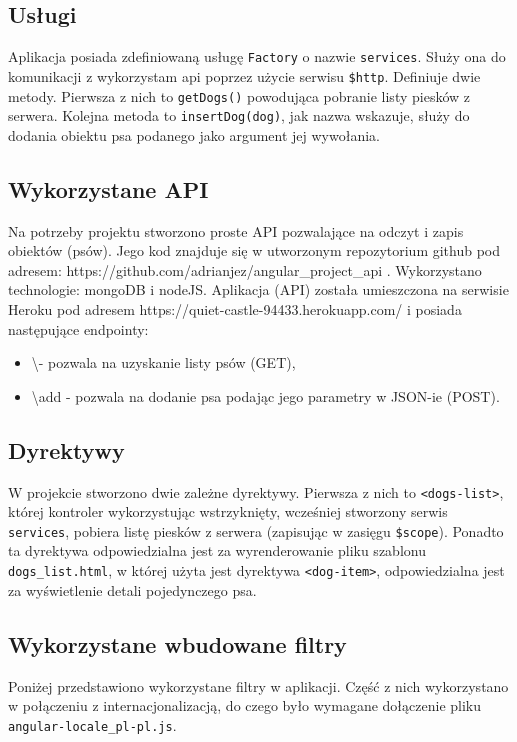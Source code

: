 \documentclass{article}
\begin{document}
\subsection{Usługi}
Aplikacja posiada zdefiniowaną usługę \verb|Factory| o nazwie \verb|services|. Służy ona do komunikacji z wykorzystam api poprzez użycie serwisu \verb|$http|. Definiuje dwie metody. Pierwsza z nich to \verb|getDogs()| powodująca pobranie listy piesków z serwera. Kolejna metoda to \verb|insertDog(dog)|, jak nazwa wskazuje, służy do dodania obiektu psa podanego jako argument jej wywołania. 

\subsection{Wykorzystane API}

Na potrzeby projektu stworzono proste API pozwalające na odczyt i zapis obiektów (psów). Jego kod znajduje się w utworzonym repozytorium github pod adresem: https://github.com/adrianjez/angular\_project\_api . Wykorzystano technologie: mongoDB i nodeJS. Aplikacja (API) została umieszczona na serwisie Heroku pod adresem https://quiet-castle-94433.herokuapp.com/ i posiada następujące endpointy:

\begin{itemize}
	\item \textbackslash  - pozwala na uzyskanie listy psów (GET),
	\item \textbackslash add  - pozwala na dodanie psa podając jego parametry w JSON-ie (POST).
\end{itemize}

\subsection{Dyrektywy}
W projekcie stworzono dwie zależne dyrektywy. Pierwsza z nich to \verb|<dogs-list>|, której kontroler wykorzystując wstrzyknięty, wcześniej stworzony serwis \verb|services|, pobiera listę piesków z serwera (zapisując w zasięgu \verb|$scope|). Ponadto ta dyrektywa odpowiedzialna jest za wyrenderowanie pliku szablonu \verb|dogs_list.html|, w której użyta jest dyrektywa \verb|<dog-item>|, odpowiedzialna jest za wyświetlenie detali pojedynczego psa. 

\subsection{Wykorzystane wbudowane filtry}
Poniżej przedstawiono wykorzystane  filtry w aplikacji. Część z nich wykorzystano w połączeniu z internacjonalizacją, do czego było wymagane dołączenie pliku \verb|angular-locale_pl-pl.js|. 
\end{document}
